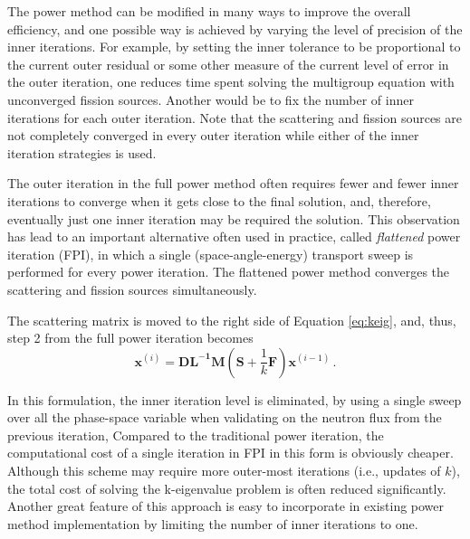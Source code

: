 The power method can be modified in many ways to improve the overall efficiency, and one possible way is achieved by varying the level of precision of the inner iterations.
For example, by setting the inner tolerance to be proportional to the current outer residual or some other measure of the current level of error in the outer iteration, one reduces time spent solving the multigroup equation with unconverged fission sources.
Another would be to fix the number of inner iterations for each outer iteration.
Note that the scattering and fission sources are not completely converged in every outer iteration while either of the inner iteration strategies is used.
\citep{gill_newtons_2011}

The outer iteration in the full power method often requires fewer and fewer inner iterations to converge when it gets close to the final solution, and, therefore, eventually just one inner iteration may be required the solution.  
This observation has lead to an important alternative often used in practice, called {\it flattened} power iteration (FPI), in which a single (space-angle-energy) transport sweep is performed for every power iteration.
The flattened power method converges the scattering and fission sources simultaneously.

The scattering matrix is moved to the right side of Equation \ref{eq:keig}, and, thus, step 2 from the full power iteration becomes 
\begin{equation}
 \mathbf{x}^{(i)} =  \mathbf{DL^{-1}M} (\mathbf{S} + \frac{1}{k} \mathbf{F})\mathbf{x}^{(i-1)}   \, .
 \label{eq:flatten}
\end{equation}

In this formulation, the inner iteration level is eliminated, by using a single sweep over all the phase-space variable when validating on the neutron flux from the previous iteration,  
Compared to the traditional power iteration, the computational cost of a single iteration in FPI in this form is obviously cheaper.
Although this scheme may require more outer-most iterations (i.e., updates of $k$), the total cost of solving the k-eigenvalue problem is often reduced significantly.\citep{gill_newtons_2011}
Another great feature of this approach is easy to incorporate in existing power method implementation by limiting the number of inner iterations to one. 

